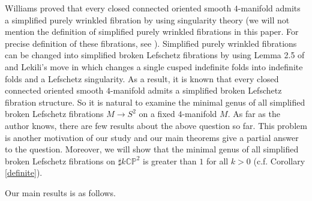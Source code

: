 \documentclass{amsart}
\theoremstyle{plain}
\theoremstyle{definition}
\begin{document}
\par

Williams \cite{Wil} proved that every closed connected oriented smooth $4$-manifold admits a simplified purely wrinkled fibration by using singularity theory 
(we will not mention the definition of simplified purely wrinkled fibrations in this paper. For precise definition of these fibrations, see \cite{Wil}). 
Simplified purely wrinkled fibrations can be changed into simplified broken Lefschetz fibrations 
by using Lemma 2.5 of \cite{Ba2} and Lekili's move in \cite{Lek} which changes a single cusped indefinite folds into indefinite folds and a Lefschetz singularity. 
As a result, it is known that every closed connected oriented smooth $4$-manifold admits a simplified broken Lefschetz fibration structure. 
So it is natural to examine the minimal genus of all simplified broken Lefschetz fibrations $M\rightarrow S^2$ on a fixed $4$-manifold $M$. 
As far as the author knows, there are few results about the above question so far. 
This problem is another motivation of our study and our main theorems give a partial answer to the question. 
Moreover, we will show that the minimal genus of all simplified broken Lefschetz fibrations on $\sharp k\mathbb{CP}^2$ is greater than $1$ for all $k>0$ (c.f. Corollary \ref{definite}). 

\par

Our main results is as follows. 
\end{document}

